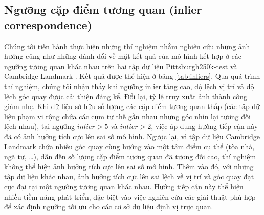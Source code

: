 \subsection{Ngưỡng cặp điểm tương quan (inlier correspondence)}

Chúng tôi tiến hành thực hiện những thí nghiệm nhằm nghiên cứu những ảnh hưởng cũng như những đánh đổi về mặt kết quả của mô hình kết hợp ở các ngưỡng tương quan khác nhau trên hai tập dữ liệu Pittsburgh250k-test \cite{6618963} và Cambridge Landmark \cite{kendall2016posenet}. Kết quả được thể hiện ở bảng \ref{tab:inliers}. Qua quá trình thí nghiệm, chúng tôi nhận thấy khi ngưỡng inlier tăng cao, độ lệch vị trí và độ lệch góc quay được cải thiện đáng kể. Đổi lại, tỷ lệ truy xuất ảnh thành công giảm nhẹ. Khi dữ liệu sở hữu số lượng các cặp điểm tương quan thấp (các tập dữ liệu phạm vi rộng chứa các cụm tư thế gần nhau nhưng góc nhìn lại tương đối lệch nhau), tại ngưỡng $inlier > 5$ và $inlier > 2$, việc áp dụng hướng tiếp cận này đã có ảnh hưởng tích cực lên sai số mô hình. Ngược lại, vì tập dữ liệu Cambridge Landmark chứa nhiều góc quay cùng hướng vào một tâm điểm cụ thể (tòa nhà, ngã tư, \dots), dẫn đến số lượng cặp điểm tương quan đã tương đối cao, thí nghiệm không thể hiện ảnh hưởng tích cực lên sai số mô hình. Thêm vào đó, với những tập dữ liệu khác nhau, ảnh hưởng tích cực lên sai lệch về vị trí và góc quay đạt cực đại tại một ngưỡng tương quan khác nhau. Hướng tiếp cận này thể hiện nhiều tiềm năng phát triển, đặc biệt vào việc nghiên cứu các giải thuật phù hợp để xác định ngưỡng tối ưu cho các cơ sở dữ liệu định vị trực quan.

